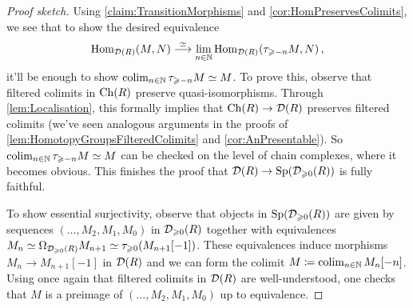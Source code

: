 \begin{proof}[Proof sketch]
	Using \cref{claim:TransitionMorphisms} and \cref{cor:HomPreservesColimits}, we see that to show the desired equivalence
	\begin{equation*}
		\Hom_{\Dd(R)}(M,N)\overset{\simeq}{\longrightarrow}\limit_{n\in\IN}\Hom_{\Dd(R)}\left(\tau_{\geqslant -n}M,N\right)\,,
	\end{equation*}
	it'll be enough to show $\operatorname*{colim}_{n\in\mathbb{N}}\tau_{\geqslant -n}M\simeq M$. To prove this, observe that filtered colimits in $\operatorname{Ch}(R)$ preserve quasi-isomorphisms. Through \cref{lem:Localisation}, this formally implies that $\operatorname{Ch}(R)\rightarrow \mathcal{D}(R)$ preserves filtered colimits (we've seen analogous arguments in the proofs of \cref{lem:HomotopyGroupsFilteredColimits} and \cref{cor:AnPresentable}). So $\operatorname*{colim}_{n\in\mathbb{N}}\tau_{\geqslant -n}M\simeq M$ can be checked on the level of chain complexes, where it becomes obvious. This finishes the proof that $\mathcal{D}(R)\rightarrow \mathrm{Sp}(\mathcal{D}_{\geqslant 0}(R))$ is fully faithful.
	
	To show essential surjectivity, observe that objects in $\mathrm{Sp}(\mathcal{D}_{\geqslant 0}(R))$ are given by sequences $(\dotsc,M_2,M_1,M_0)$ in $\mathcal{D}_{\geqslant 0}(R)$ together with equivalences $M_n\simeq \Omega_{\mathcal{D}_{\geqslant 0}(R)}M_{n+1}\simeq \tau_{\geqslant 0}(M_{n+1}[-1])$. These equivalences induce morphisms $M_n\rightarrow M_{n+1}[-1]$ in $\mathcal{D}(R)$ and we can form the colimit $M\coloneqq \operatorname*{colim}_{n\in\mathbb{N}}M_n[-n]$. Using once again that filtered colimits in $\mathcal{D}(R)$ are well-understood, one checks that $M$ is a preimage of $(\dotsc,M_2,M_1,M_0)$ up to equivalence.
\end{proof}


